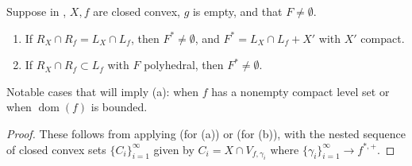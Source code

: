 \begin{prop}\label{prop:045-primal-reachability}
	Suppose in , $X,f$ are closed convex, $g$ is empty, and that $F\neq\emptyset$.
	\begin{enumerate}[label=(\alph*)]
		\item If $R_X\cap R_f=L_X\cap L_f$, then $F^\ast\neq\emptyset$, and $F^\ast=L_X\cap L_f+X'$ with $X'$ compact.
		\item If $R_X\cap R_f\subset L_f$ with $F$ polyhedral, then $F^\ast\neq\emptyset$.
	\end{enumerate}
	Notable cases that will imply (a): when $f$ has a nonempty compact level set or when $\operatorname{dom}(f)$ is bounded.
\end{prop}

\begin{proof}
	These follows from applying  (for (a)) or  (for (b)), with the nested sequence of closed convex sets $\{C_i\}_{i=1}^{\infty}$ given by $C_i=X\cap V_{f,\gamma_i}$ where $\{\gamma_i\}_{i=1}^{\infty}\to f^{\ast,+}$.
\end{proof}

